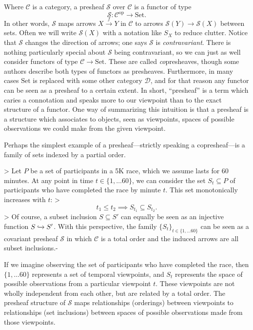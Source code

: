 Where $\mathcal{C}$ is a category, a presheaf $\mathcal{S}$ over $\mathcal{C}$ is a functor of type
\[ \mathcal{S}: \mathcal{C}^\textrm{op} \to \mathrm{Set}.\]
In other words, $\mathcal{S}$ maps arrows $X \xrightarrow{f} Y$ in $\mathcal{C}$ to arrows $\mathcal{S}(Y) \to \mathcal{S}(X)$ between sets.  Often we will write $\mathcal{S}(X)$ with a notation like $S_X$ to reduce clutter. Notice that $\mathcal{S}$ changes the direction of arrows; one says $\mathcal{S}$ is \emph{contravariant}. There is nothing particularly special about $\mathcal{S}$ being contravariant, so we can just as well consider functors of type $\mathcal{C} \to \mathrm{Set}$. These are called \emph{co}presheaves, though some authors describe both types of functors as presheaves.
Furthermore, in many cases $\mathrm{Set}$ is replaced with some other category $\mathcal{D}$, and for that reason any functor can be seen as a presheaf to a certain extent. In short, ``presheaf'' is a term which caries a connotation and speaks more to our viewpoint than to the exact structure of a functor. One way of summarizing this intuition is that a presheaf is a structure which associates to objects, seen as viewpoints, spaces of possible observations we could make from the given viewpoint.


Perhaps the simplest example of a presheaf---strictly speaking a copresheaf---is a family of sets indexed by a partial order.
\begin{example}\label{exm:race}
>   Let $P$ be a set of participants in a 5K race, which we assume lasts for 60 minutes. At any point in time $t \in \{1, \ldots 60\}$, we can consider the set $S_t \subseteq P$ of participants who have completed the race by minute $t$. This set monotonically increases with $t$:
>   \[t_1 \leq t_2 \implies S_{t_1} \subseteq S_{t_2}.\]
>   Of course, a subset inclusion $S \subseteq S'$ can equally be seen as an injective function $S \xhookrightarrow{} S'$. With this perspective, the family $\{S_t\}_{t \in \{1, \ldots 60\}}$ can be seen as a covariant presheaf $\mathcal{S}$ in which $\mathcal{C}$ is a total order and the induced arrows are all subset inclusions.-
\end{example}
If we imagine observing the set of participants who have completed the race, then $\{1, \ldots 60\}$ represents a set of temporal viewpoints, and $S_{t}$ represents the space of possible observations from a particular viewpoint $t$. These viewpoints are not wholly independent from each other, but are related by a total order. The presheaf structure of $\mathcal{S}$ maps relationships (orderings) between viewpoints to relationships (set inclusions) between spaces of possible observations made from those viewpoints.

